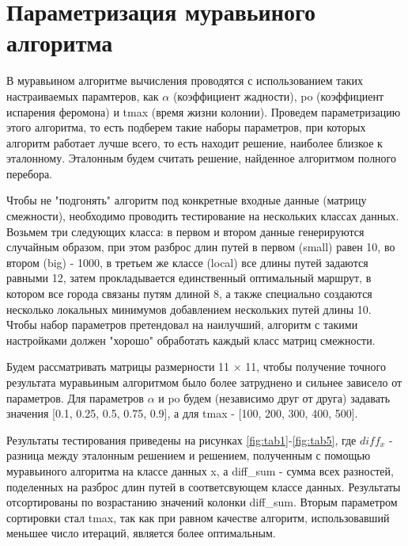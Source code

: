 \section{Параметризация муравьиного алгоритма}

В муравьином алгоритме вычисления проводятся с использованием таких настраиваемых парамтеров, как $\alpha$ (коэффициент жадности), po (коэффициент испарения феромона) и tmax (время жизни колонии). Проведем параметризацию этого алгоритма, то есть подберем такие наборы параметров, при которых алгоритм работает лучше всего, то есть находит решение, наиболее близкое к эталонному. Эталонным будем считать решение, найденное алгоритмом полного перебора. 

Чтобы не "подгонять" алгоритм под конкретные входные данные (матрицу смежности), необходимо проводить тестирование на нескольких классах данных. Возьмем три следующих класса: в первом и втором данные генерируются случайным образом, при этом разброс длин путей в первом (small) равен 10, во втором (big) - 1000, в третьем же классе (local) все длины путей задаются равными 12, затем прокладывается единственный оптимальный маршрут, в котором все города связаны путям длиной 8, а также специально создаются несколько локальных минимумов добавлением нескольких путей длины 10. Чтобы набор параметров претендовал на наилучший, алгоритм с такими настройками должен "хорошо" обработать каждый класс матриц смежности. 
 
Будем рассматривать матрицы размерности 11 × 11, чтобы получение точного результата муравьиным алгоритмом было более затруднено и сильнее зависело от параметров. Для параметров  $\alpha$ и po будем (независимо друг от друга) задавать значения [0.1, 0.25, 0.5, 0.75, 0.9], а для tmax - [100, 200, 300, 400, 500]. 

Результаты тестирования приведены на рисунках \ref{fig:tab1}-\ref{fig:tab5}, где $diff_x$ - разница между эталонным решением и решением, полученным с помощью муравьиного алгоритма на классе данных x, а diff\_sum - сумма всех разностей, поделенных на разброс длин путей в соответсвующем классе данных. Результаты отсортированы по возрастанию значений колонки diff\_sum. Вторым параметром сортировки стал tmax, так как при равном качестве алгоритм, использовавший меньшее число итераций, является более оптимальным.


